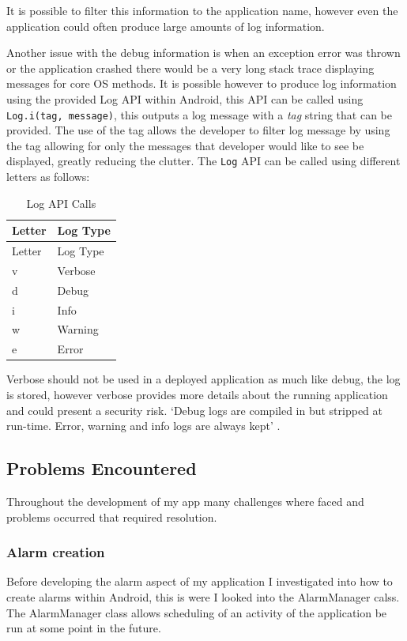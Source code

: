 It is possible to filter this information to the application name,
however even the application could often produce large amounts of log
information.

Another issue with the debug information is when an exception error was
thrown or the application crashed there would be a very long stack trace
displaying messages for core OS methods. It is possible however to
produce log information using the provided Log API within Android, this
API can be called using \lstinline!Log.i(tag, message)!, this outputs a
log message with a \emph{tag} string that can be provided. The use of
the tag allows the developer to filter log message by using the tag
allowing for only the messages that developer would like to see be
displayed, greatly reducing the clutter. The \lstinline!Log! API can be
called using different letters as follows:

\pagebreak

\begin{longtable}[]{@{}ll@{}}
\caption{Log API Calls}\tabularnewline
\toprule
Letter & Log Type\tabularnewline
\midrule
\endfirsthead
\toprule
Letter & Log Type\tabularnewline
\midrule
\endhead
v & Verbose\tabularnewline
d & Debug\tabularnewline
i & Info\tabularnewline
w & Warning\tabularnewline
e & Error\tabularnewline
\bottomrule
\end{longtable}

Verbose should not be used in a deployed application as much like debug,
the log is stored, however verbose provides more details about the
running application and could present a security risk. `Debug logs are
compiled in but stripped at run-time. Error, warning and info logs are
always kept' \parencite{androidLog}.

\subsection{Problems Encountered}\label{problems-encountered}

Throughout the development of my app many challenges where faced and
problems occurred that required resolution.

\subsubsection{Alarm creation}\label{alarm-creation}

Before developing the alarm aspect of my application I investigated into
how to create alarms within Android, this is were I looked into the
AlarmManager calss. The AlarmManager class allows scheduling of an
activity of the application be run at some point in the future.

